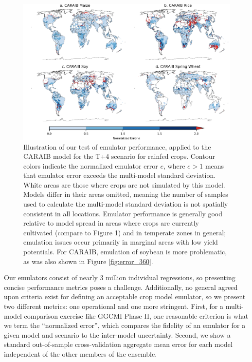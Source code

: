 \documentclass[gmd, manuscript]{copernicus} %
\begin{document}
\begin{figure}[ht]
\centering
    \includegraphics[width=16cm]{figures/CARAIB_spatial_error.png}
    \caption{
    Illustration of our test of emulator performance, applied to the CARAIB model for the T+4 scenario for rainfed crops. 
    Contour colors indicate the normalized emulator error $e$, where $e > 1$ means that emulator error exceeds the multi-model standard deviation. 
    White areas are those where crops are not simulated by this model. 
    Models differ in their areas omitted, meaning the number of samples used to calculate the multi-model standard deviation is not spatially consistent in all locations. 
    Emulator performance is generally good relative to model spread in areas where crops are currently cultivated (compare to Figure 1) and in temperate zones in general; emulation issues occur primarily in marginal areas with low yield potentials. 
    For CARAIB, emulation of soybean is more problematic, as was also shown in Figure \ref{fig:error_360}.
    }
   \label{fig:error}
\end{figure}

Our emulators consist of nearly 3 million individual regressions, so presenting concise performance metrics poses a challenge.
Additionally, no general agreed upon criteria exist for defining an acceptable crop model emulator, so we present two different metrics: one operational and one more stringent. 
First, for a multi-model comparison exercise like GGCMI Phase II, one reasonable criterion is what we term the ``normalized error'', which compares the fidelity of an emulator for a given model and scenario to the inter-model uncertainty. 
Second, we show a standard out-of-sample cross-validation aggregate mean error for each model independent of the other members of the ensemble. 
\end{document}
